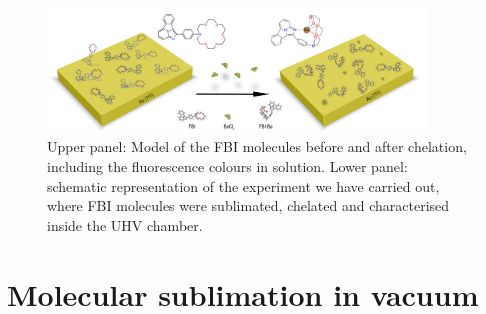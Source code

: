 \documentclass[aps,prl,reprint,longbibliography,superscriptaddress, english]{revtex4-1}
\begin{document}

 \begin{figure}[ht!]
	\includegraphics[width=0.9\textwidth]{figures/figura_1a.jpg}
	\caption{\label{ModeloFBI} 
    Upper panel: Model of the FBI molecules before and after chelation, including the fluorescence colours in solution. Lower panel: schematic representation of the experiment we have carried out, where FBI molecules were sublimated, chelated and characterised inside the UHV chamber.}
\end{figure}  


\section{Molecular sublimation in vacuum}
\end{document}
